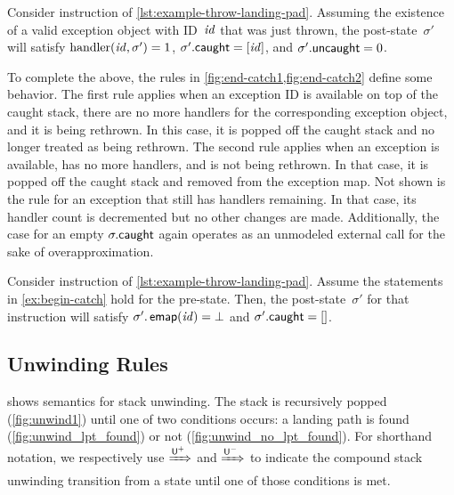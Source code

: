 \begin{example}\label{ex:begin-catch}
  Consider instruction  of \cref{lst:example-throw-landing-pad}.
  Assuming the existence of a valid exception object with ID~$\mathit{id}$ that was just thrown, the post-state~$\sigma'$ will satisfy $\operatorname{handler}(\mathit{id},\sigma')=1$, $\sigma'.\mathsf{caught}=[\mathit{id}]$, and $\sigma'.\mathsf{uncaught}=0$.
\end{example}
To complete the above, the rules in \cref{fig:end-catch1,fig:end-catch2} define some  behavior.
The first rule applies when an exception ID is available on top of the caught stack, there are no more handlers for the corresponding exception object,
and it is being rethrown.
In this case, it is popped off the caught stack and no longer treated as being rethrown.
The second rule applies when an exception is available, has no more handlers, and is not being rethrown. In that case, it is popped off the caught stack and removed from the exception map.
Not shown is the rule for an exception that still has handlers remaining.
In that case, its handler count is decremented but no other changes are made.
Additionally, the case for an empty $\sigma.\mathsf{caught}$ again operates as an unmodeled external call for the sake of overapproximation.
\begin{example}
  Consider instruction  of \cref{lst:example-throw-landing-pad}.
  Assume the statements in \cref{ex:begin-catch} hold for the pre-state.
  Then, the post-state~$\sigma'$ for that instruction will satisfy $\sigma'.\operatorname{\mathsf{emap}}(\mathit{id})=\bot$ and $\sigma'.\mathsf{caught}=[]$.
\end{example}
\subsection{Unwinding Rules}
 shows semantics for stack unwinding.
The stack is recursively popped (\cref{fig:unwind1}) until one of two conditions occurs: a landing path is found (\cref{fig:unwind_lpt_found}) or not (\cref{fig:unwind_no_lpt_found}).
For shorthand notation, we respectively use $\xRightarrow{\mathsf U^+}$ and $\xRightarrow{\mathsf U^-}$ to indicate the compound stack unwinding transition from a state until one of those conditions is met.


